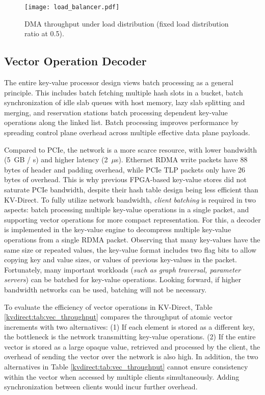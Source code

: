 \begin{figure}[htbp]
	\centering
	{\texttt{[image: load\_balancer.pdf]}}
	\caption{DMA throughput under load distribution (fixed load distribution ratio at 0.5).}
	\label{kvdirect:fig:cache-tput}
\end{figure}

\subsection{Vector Operation Decoder}

The entire key-value processor design views batch processing as a general principle.
This includes batch fetching multiple hash slots in a bucket, batch synchronization of idle slab queues with host memory, lazy slab splitting and merging, and reservation stations batch processing dependent key-value operations along the linked list.
Batch processing improves performance by spreading control plane overhead across multiple effective data plane payloads.

Compared to PCIe, the network is a more scarce resource, with lower bandwidth (5~GB / s) and higher latency (2~$\mu$s).
Ethernet RDMA write packets have 88 bytes of header and padding overhead, while PCIe TLP packets only have 26 bytes of overhead.
This is why previous FPGA-based key-value stores \cite{blott13hotcloud,blott2015scaling} did not saturate PCIe bandwidth, despite their hash table design being less efficient than KV-Direct.
To fully utilize network bandwidth, \textit {client batching} is required in two aspects: batch processing multiple key-value operations in a single packet, and supporting vector operations for more compact representation. For this, a decoder is implemented in the key-value engine to decompress multiple key-value operations from a single RDMA packet.
Observing that many key-values have the same size or repeated values, the key-value format includes two flag bits to allow copying key and value sizes, or values of previous key-values in the packet.
Fortunately, many important workloads (\textit {such as graph traversal, parameter servers}) can be batched for key-value operations.
Looking forward, if higher bandwidth networks can be used, batching will not be necessary.

To evaluate the efficiency of vector operations in KV-Direct,
Table \ref {kvdirect:tab:vec_throughput} compares the throughput of atomic vector increments with two alternatives:
(1) If each element is stored as a different key, the bottleneck is the network transmitting key-value operations.
(2) If the entire vector is stored as a large opaque value, retrieved and processed by the client, the overhead of sending the vector over the network is also high.
In addition, the two alternatives in Table \ref {kvdirect:tab:vec_throughput} cannot ensure consistency within the vector when accessed by multiple clients simultaneously. Adding synchronization between clients would incur further overhead.

